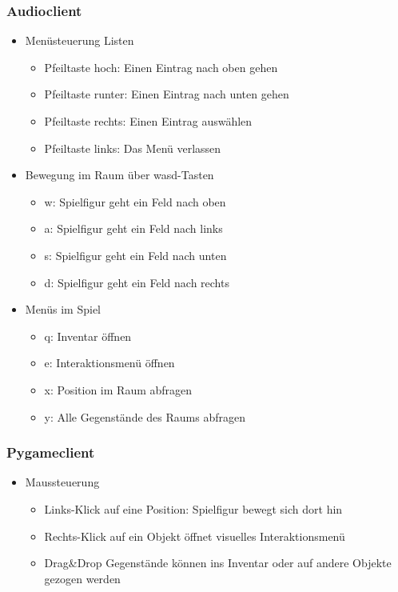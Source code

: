 \documentclass[10pt, a4paper,onecolumn]{article}
\begin{document}
\subsubsection*{Audioclient}
\begin{itemize}
\item{}Menüsteuerung Listen
	\begin{itemize}
	\item{}Pfeiltaste hoch: Einen Eintrag nach oben gehen
	\item{}Pfeiltaste runter: Einen Eintrag nach unten gehen
	\item{}Pfeiltaste rechts: Einen Eintrag auswählen
	\item{}Pfeiltaste links: Das Menü verlassen
	\end{itemize}
\item{}Bewegung im Raum über wasd-Tasten
	\begin{itemize}
	\item{}w: Spielfigur geht ein Feld nach oben
	\item{}a: Spielfigur geht ein Feld nach links
	\item{}s: Spielfigur geht ein Feld nach unten
	\item{}d: Spielfigur geht ein Feld nach rechts
	\end{itemize}
\item{}Menüs im Spiel
	\begin{itemize}
	\item{}q: Inventar öffnen
	\item{}e: Interaktionsmenü öffnen
	\item{}x: Position im Raum abfragen
	\item{}y: Alle Gegenstände des Raums abfragen
	\end{itemize}
\end{itemize}

\subsubsection*{Pygameclient}
\begin{itemize}
\item{}Maussteuerung
	\begin{itemize}
	\item{}Links-Klick auf eine Position: Spielfigur bewegt sich dort hin
	\item{}Rechts-Klick auf ein Objekt öffnet visuelles Interaktionsmenü
	\item{}Drag\&Drop Gegenstände können ins Inventar oder auf andere Objekte gezogen werden
	\end{itemize}
\end{itemize}
\end{document}
